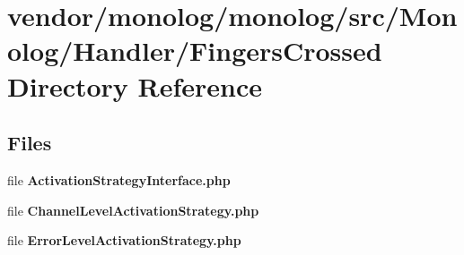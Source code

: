 \section{vendor/monolog/monolog/src/\+Monolog/\+Handler/\+Fingers\+Crossed Directory Reference}
\label{dir_99706c5bcd5bd2eb36e6374dddaaae2b}
\subsection*{Files}
\begin{DoxyCompactItemize}
\item 
file {\bf Activation\+Strategy\+Interface.\+php}
\item 
file {\bf Channel\+Level\+Activation\+Strategy.\+php}
\item 
file {\bf Error\+Level\+Activation\+Strategy.\+php}
\end{DoxyCompactItemize}
